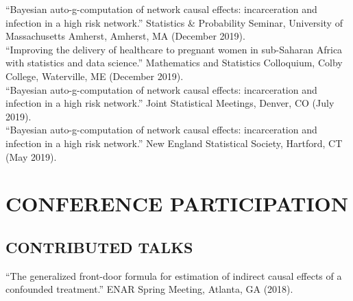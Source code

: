 \documentclass[12pt]{article}
\begin{document}




``Bayesian auto-g-computation of network causal effects: incarceration and infection in a high risk network.'' Statistics \& Probability Seminar, University of Massachusetts Amherst, Amherst, MA (December 2019). \\

``Improving the delivery of healthcare to pregnant women in sub-Saharan Africa with statistics and data science.'' Mathematics and Statistics Colloquium, Colby College, Waterville, ME (December 2019). \\ 

``Bayesian auto-g-computation of network causal effects: incarceration and infection in a high risk network.'' Joint Statistical Meetings, Denver, CO (July 2019). \\

``Bayesian auto-g-computation of network causal effects: incarceration and infection in a high risk network.'' New England Statistical Society, Hartford, CT (May 2019). 

\section*{\textbf{{\large C}{ONFERENCE} {\large P}{ARTICIPATION}}}  

\subsection*{\textbf{CONTRIBUTED TALKS}}


``The generalized front-door formula for estimation of indirect causal effects of a confounded treatment.'' ENAR Spring Meeting, Atlanta, GA (2018). \\
\end{document}
